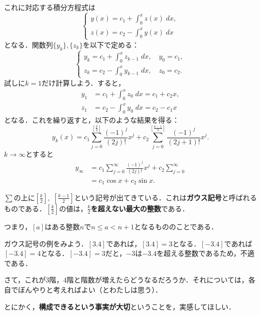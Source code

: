 \begin{example}
    これに対応する積分方程式は
    \begin{equation}
        \begin{cases}
            y(x) = c_1 + \int_{0}^{x} z(x) \; dx, \\
            z(x) = c_2 - \int_{0}^{x} y(x) \; dx
        \end{cases}
    \end{equation}
    となる．関数列$\{y_k\}, \{z_k\}$を以下で定める：
    \begin{equation}
        \begin{cases}
            y_k = c_1 + \int_{0}^{x} z_{k-1} \; dx, \quad y_0 = c_1, \\
            z_k = c_2 - \int_{0}^{x} y_{k-1} \; dx, \quad z_0 = c_2.
        \end{cases}
    \end{equation}
    試しに$k=1$だけ計算しよう．すると，
    \begin{align*}
        y_1 &= c_1 + \int_{0}^{x} z_0 \; dx = c_1 + c_2 x, \\
        z_1 &= c_2 - \int_{0}^{x} y_0 \; dx = c_2 - c_1 x
    \end{align*}
    となる．これを繰り返すと，以下のような結果を得る：
    \begin{equation}
        y_k(x) = c_1 \sum_{j=0}^{[\frac{k}{2}]} \frac{(-1)^j}{(2j)!} x^j + c_2 \sum_{j=0}^{[\frac{k-1}{2}]} \frac{(-1)^j}{(2j+1)!} x^j.
    \end{equation}
    $k \to \infty$とすると
    \begin{align}
        y_{\infty} &= c_1 \sum_{j=0}^{\infty} \frac{(-1)^j}{(2j)!} x^j + c_2 \sum_{j=0}^{\infty} \\
        &= c_1 \cos x + c_2 \sin x.
    \end{align}
\end{example}

\begin{note*}[ガウス記号]
    $\sum$の上に$[\frac{k}{2}], \; [\frac{k-1}{2}]$という記号が出てきている．これは\textbf{ガウス記号}と呼ばれるものである．$[\frac{k}{2}]$の値は，\textbf{$\frac{k}{2}$を超えない最大の整数}である．

    つまり，$[a]$はある整数$n$で$n \leq a <n+1$となるもののことである．
    
    ガウス記号の例をみよう．$[3.4]$であれば，$[3.4]=3$となる．$[-3.4]$であれば$[-3.4]=4$となる．$[-3.4]=3$だと，$-3$は$-3.4$を超える整数であるため，不適である．
\end{note*}
さて，これが3階，4階と階数が増えたらどうなるだろうか．それについては，各自でぼんやりと考えればよい（とわたしは思う）．

とにかく，\textbf{構成できるという事実が大切}ということを，実感してほしい．